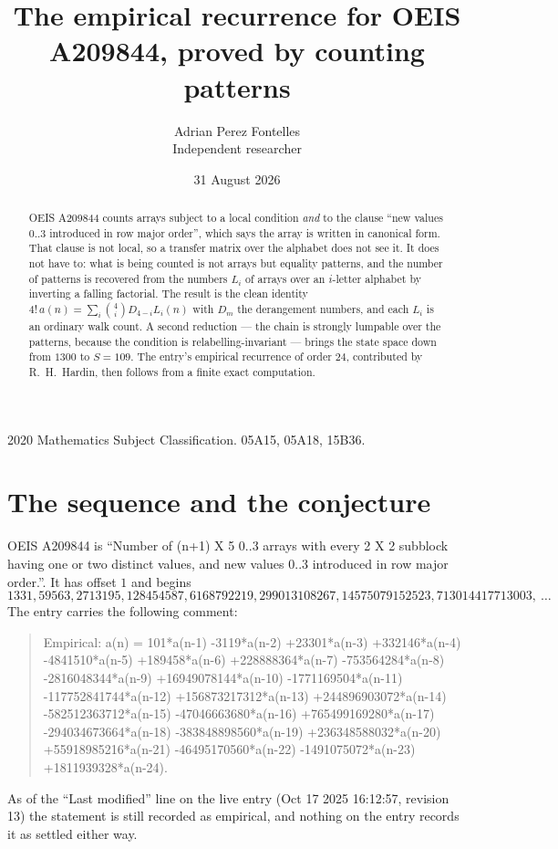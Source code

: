\documentclass[11pt,a4paper]{article}
\title{The empirical recurrence for OEIS A209844, proved by counting patterns}
\author{Adrian Perez Fontelles\\ \small Independent researcher}
\date{31 August 2026}
\theoremstyle{plain}
\theoremstyle{definition}
\begin{document}
\maketitle

\begin{abstract}
OEIS A209844 counts arrays subject to a local condition \emph{and} to the clause ``new values
$0..3$ introduced in row major order'', which says the array is written in canonical
form. That clause is not local, so a transfer matrix over the alphabet does not see it. It
does not have to: what is being counted is not arrays but equality patterns, and the number
of patterns is recovered from the numbers $L_i$ of arrays over an $i$-letter alphabet by
inverting a falling factorial. The result is the clean identity
$4!\,a(n)=\sum_i\binom{4}{i}D_{4-i}L_i(n)$ with $D_m$ the derangement numbers,
and each $L_i$ is an ordinary walk count. A second reduction --- the chain is strongly
lumpable over the patterns, because the condition is relabelling-invariant --- brings the
state space down from $1300$ to $S=109$. The entry's empirical recurrence of order
$24$, contributed by R.~H.~Hardin, then follows from a finite exact computation.
\end{abstract}

\noindent\small 2020 Mathematics Subject Classification. 05A15, 05A18, 15B36.\normalsize

\section{The sequence and the conjecture}

OEIS A209844 is ``Number of (n+1) X 5 0..3 arrays with every 2 X 2 subblock having one or two distinct values, and new values 0..3 introduced in row major order.''. It has offset $1$ and begins
\[
1331, 59563, 2713195, 128454587, 6168792219, 299013108267, 14575079152523, 713014417713003,\ \dots
\]
The entry carries the following comment:
\begin{quote}\small
Empirical: a(n) = 101*a(n-1) -3119*a(n-2) +23301*a(n-3) +332146*a(n-4) -4841510*a(n-5) +189458*a(n-6) +228888364*a(n-7) -753564284*a(n-8) -2816048344*a(n-9) +16949078144*a(n-10) -1771169504*a(n-11) -117752841744*a(n-12) +156873217312*a(n-13) +244896903072*a(n-14) -582512363712*a(n-15) -47046663680*a(n-16) +765499169280*a(n-17) -294034673664*a(n-18) -383848898560*a(n-19) +236348588032*a(n-20) +55918985216*a(n-21) -46495170560*a(n-22) -1491075072*a(n-23) +1811939328*a(n-24).
\end{quote}
As of the ``Last modified'' line on the live entry (Oct 17 2025 16:12:57, revision 13) the statement is
still recorded as empirical, and nothing on the entry records it as settled either way.
\end{document}
